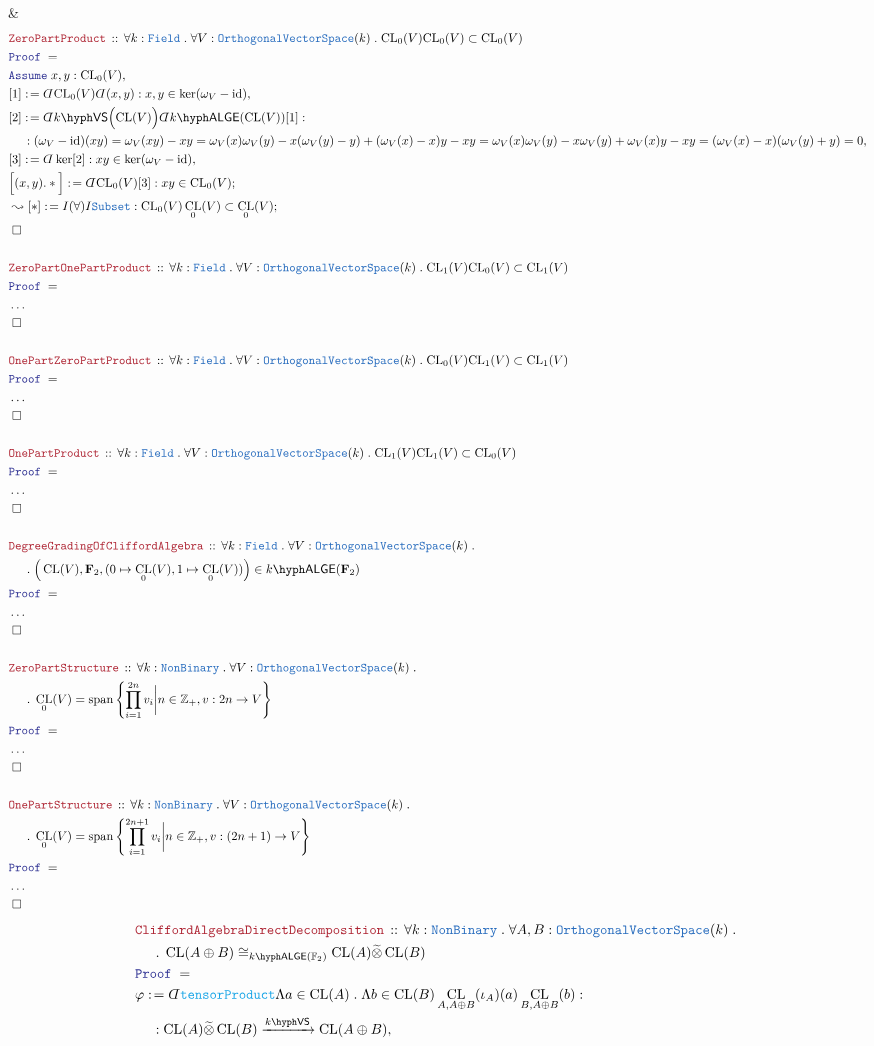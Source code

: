 \documentclass[12pt]{scrartcl}%
\newcommand{\TYPE}[1]{\textcolor{NavyBlue}{\mathtt{#1}}}%
\newcommand{\FUNC}[1]{\textcolor{Cerulean}{\mathtt{#1}}}%
\newcommand{\LOGIC}[1]{\textcolor{Blue}{\mathtt{#1}}}%
\newcommand{\THM}[1]{\textcolor{Maroon}{\mathtt{#1}}}%
\renewcommand{\.}{\; . \;} %
\newcommand{\de}{: \kern 0.1pc =} %
\newcommand{\Theorem}[2]{& \THM{#1} \, :: \, #2 \\ & \Proof = \\ } %
\newcommand{\NewLine}{\\ & \kern 1pc}%
\newcommand{\Page}[1]{ \begin{align*} #1 \end{align*}  }%
\newcommand{ \bd }{ \ByDef }%
\newcommand{\NoProof}{ & \ldots \\ \EndProof}%
\newcommand{\Int}{\mathbb{Z}}%
\DeclareMathOperator*{\id}{id}%
\newcommand{\Say}[3]{& #1 \de #2 : #3, \\} %
\newcommand{\Conclude}[3]{& #1 \de #2 : #3; \\}%
\newcommand{\DeriveConclude}[3]{& \leadsto #1 \de #2 : #3 ; \\} %
\newcommand{\Assume}[2]{& \LOGIC{Assume} \; #1 : #2, \\} %
\newcommand{\QED}{\; \square} %
\newcommand{\EndProof}{& \QED \\} %
\newcommand{\ByDef}{\rotatebox[origin=c]{-180}{$D$}}%
\newcommand{\Proof}{\LOGIC{Proof} \; } %
\newcommand{\Arrow}[1]{\xrightarrow{#1}}%
\newcommand{\OVS}{\TYPE{OrthogonalVectorSpace}}
\DeclareMathOperator{\Span}{span} %
\newcommand{\VS}[1]{#1\hyph\mathsf{VS}} %
\newcommand{\Field}{\TYPE{Field}}
\newcommand{\LALGE}[1]{#1\hyph\mathsf{ALGE}}%
\DeclareMathOperator{\CL}{CL}%
\begin{document}
{	\EndProof
}\Page{
	\Theorem{ZeroPartProduct}
	{
		\forall k : \Field \. 
		\forall V : \OVS(k) \.
		\mathrm{CL}_0(V)\mathrm{CL}_0(V) \subset \mathrm{CL}_0(V)
	}
	\Assume{x,y}{\mathrm{CL}_0(V)}
	\Say{[1]}{\bd \mathrm{CL}_0(V)\bd(x,y)}
	{
		x,y \in \ker(\omega_V - \id)
	}
	\Say{[2]}{\bd \VS{k}\Big(\mathrm{CL}(V)\Big)\bd \LALGE{k}(\mathrm{CL}(V))[1]}
	{
		\NewLine :
		(\omega_V - \id)(xy) = 
		\omega_V(xy) - xy =
		\omega_V(x)\omega_V(y) - x(\omega_V(y) - y) + (\omega_V(x) - x)y - xy =
		\omega_V(x)\omega_V(y) - x\omega_V(y) + \omega_V(x)y - xy =
		(\omega_V(x) - x)(\omega_V(y) + y) = 0
	}
	\Say{[3]}{\bd \ker [2]}{xy \in \ker (\omega_V - \id)}
	\Conclude{\Big[(x,y).*\Big]}{\bd \mathrm{CL}_0(V)[3]}{xy \in \mathrm{CL}_0(V)}
	\DeriveConclude{[*]}{I(\forall)I\TYPE{Subset}}{ \mathrm{CL}_0(V)\CL_0(V) \subset \CL_0(V)}
	\EndProof
	\\
	\Theorem{ZeroPartOnePartProduct}
	{
		\forall k : \Field \. 
		\forall V : \OVS(k) \.
		\mathrm{CL}_1(V)\mathrm{CL}_0(V) \subset \mathrm{CL}_1(V)
	}
	\NoProof
	\\
	\Theorem{OnePartZeroPartProduct}
	{
		\forall k : \Field \. 
		\forall V : \OVS(k) \.
		\mathrm{CL}_0(V)\mathrm{CL}_1(V) \subset \mathrm{CL}_1(V)
	}
	\NoProof
	\\
	\Theorem{OnePartProduct}
	{
		\forall k : \Field \. 
		\forall V : \OVS(k) \.
		\mathrm{CL}_1(V)\mathrm{CL}_1(V) \subset \mathrm{CL}_0(V)
	}
	\NoProof
	\\
	\Theorem{DegreeGradingOfCliffordAlgebra}
	{
		\forall k : \Field \.
		\forall V : \OVS(k) \. \NewLine \. 
		\Big(\CL(V),\mathbf{F}_2,(0\mapsto\CL_0(V),1\mapsto\CL_0(V)) \Big)
		\in \LALGE{k}(\mathbf{F}_2)
	}
	\NoProof
	\\
	\Theorem{ZeroPartStructure}
	{
		\forall k : \TYPE{NonBinary} \.
		\forall V : \OVS(k) \. \NewLine \.
		\CL_0(V) = \Span\left\{ \prod^{2n}_{i=1} v_i \bigg| n \in \Int_+, v : 2n \to V  \right\}
	}
	\NoProof
	\\
	\Theorem{OnePartStructure}
	{
		\forall k : \TYPE{NonBinary} \.
		\forall V : \OVS(k) \. \NewLine \.
		\CL_0(V) = \Span\left\{ \prod^{2n + 1}_{i=1} v_i \bigg| n \in \Int_+, v : (2n + 1) \to V  \right\}
	}
	\NoProof
}\Page{
	\Theorem{CliffordAlgebraDirectDecomposition}
	{
		\forall k : \TYPE{NonBinary} \.
		\forall A,B : \OVS(k) \. \NewLine \.  
		\CL(A \oplus B) \cong_{\LALGE{k}(\mathbb{F}_2)} \CL(A) \widetilde{\otimes} \CL(B)
	}
	\Say{\varphi}{\bd \FUNC{tensorProduct}\Lambda a \in \CL(A) \. \Lambda b \in \CL(B) \CL_{A,A\oplus B}(\iota_A)(a)\CL_{B,A\oplus B}(b)}
	{ \NewLine : \CL(A)  \widetilde{\otimes} \CL(B) \Arrow{\VS{k}} \CL(A \oplus B) }
}
\end{document}
